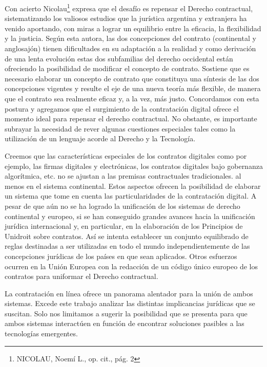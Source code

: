 \documentclass[12pt]{report} %
\begin{document}
\begin{itemize}
Con acierto Nicolau\footnote{NICOLAU, Noemí L., op. cit., pág. 2}  expresa que el desafío es repensar el Derecho contractual, sistematizando los valiosos estudios que la jurística argentina y extranjera ha venido aportando, con miras a lograr un equilibrio entre la eficacia, la flexibilidad y la justicia. Según esta autora, las dos concepciones del contrato (continental y anglosajón) tienen dificultades en su adaptación a la realidad y como derivación de una lenta evolución estas dos subfamilias del derecho occidental están ofreciendo la posibilidad de modificar el concepto de contrato. Sostiene que es necesario elaborar un concepto de contrato que constituya una síntesis de las dos concepciones vigentes y resulte el eje de una nueva teoría más flexible, de manera que el contrato sea realmente eficaz y, a la vez, más justo. Concordamos con esta postura y agregamos que el surgimiento de la contratación digital ofrece el momento  ideal  para  repensar el  derecho contractual. No obstante, es importante subrayar la necesidad de rever  algunas cuestiones especiales  tales como la utilización de un lenguaje acorde al Derecho y la Tecnología.

Creemos que las características especiales de los contratos digitales como por ejemplo, las firmas digitales y electrónicas, los contratos digitales bajo gobernanza algorítmica, etc. no se ajustan a las premisas contractuales tradicionales. al menos en el sistema continental. Estos aspectos ofrecen la posibilidad de elaborar un sistema que tome en cuenta las particularidades de la contratación digital. A pesar de que aún no se ha logrado la unificación de los sistemas de derecho continental y europeo, si se han conseguido grandes avances hacia la unificación jurídica internacional y, en  particular, en la elaboración de los Principios de Unidroit sobre contratos. Así se intenta establecer un conjunto equilibrado de reglas destinadas a ser utilizadas en todo el mundo independientemente de las concepciones jurídicas de los países en que sean aplicados. Otros esfuerzos ocurren  en la Unión Europea con la redacción de un código único  europeo de los contratos para uniformar el Derecho contractual.  

La contratación en línea ofrece un panorama alentador para la unión de ambos sistemas. Excede este trabajo analizar las distintas implicancias jurídicas que se suscitan. Solo nos limitamos a sugerir la posibilidad que se presenta para que  ambos  sistemas interactúen en función de encontrar soluciones  pasibles  a las tecnologías emergentes.


\end{itemize}
\end{document}
